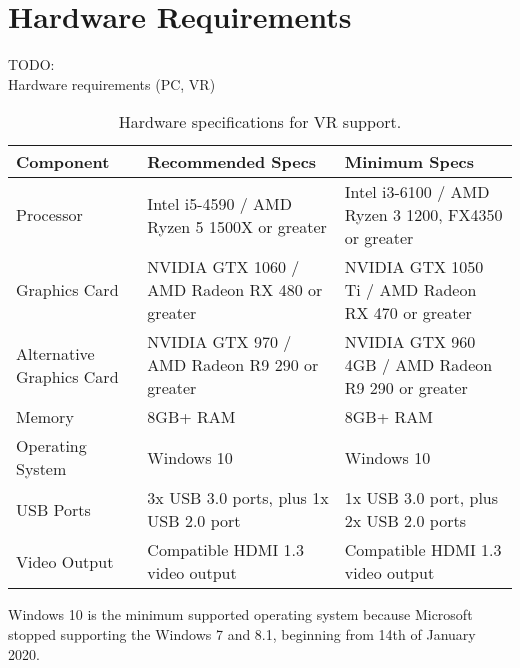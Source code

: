 \documentclass[]{tukethesis}
\begin{document}
\section{Hardware Requirements}

TODO: \\

Hardware requirements (PC, VR) \\

\begin{table}[!ht]
	\centering\footnotesize
	\begin{tabular}{ |p{4cm}||p{5.1cm}|p{5.1cm}|  }
		\hline
		Component & Recommended Specs & Minimum Specs \\
		\hline
		Processor & Intel i5-4590 / AMD Ryzen 5 1500X or greater & Intel i3-6100 / AMD Ryzen 3 1200, FX4350 or greater  \\
		Graphics Card & NVIDIA GTX 1060 / AMD Radeon RX 480 or greater & NVIDIA GTX 1050 Ti / AMD Radeon RX 470 or greater  \\
		Alternative Graphics Card & NVIDIA GTX 970 / AMD Radeon R9 290 or greater & NVIDIA GTX 960 4GB / AMD Radeon R9 290 or greater  \\
		Memory & 8GB+ RAM & 8GB+ RAM  \\
		Operating System & Windows 10 & Windows 10  \\
		USB Ports & 3x USB 3.0 ports, plus 1x USB 2.0 port & 1x USB 3.0 port, plus 2x USB 2.0 ports  \\
		Video Output & 	Compatible HDMI 1.3 video output & Compatible HDMI 1.3 video output  \\
		\hline
	\end{tabular}
	\caption{Hardware specifications for VR support.}
	\label{tab:vr-specs}
\end{table}

Windows 10 is the minimum supported operating system because Microsoft stopped supporting the Windows 7 and 8.1, beginning from 14th of January 2020.

\end{document}
